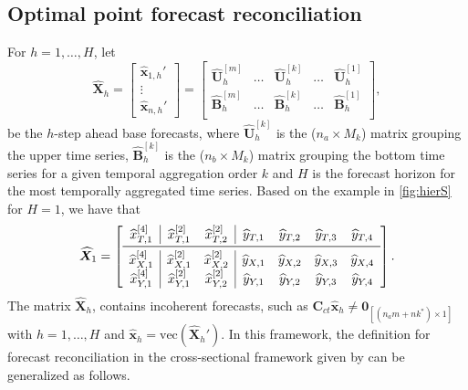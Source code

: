 \documentclass[a4paper,11pt]{article}
\newcommand{\xvet}{\bm{x}}
\newcommand{\Bvet}{\bm{B}}
\newcommand{\Cvet}{\bm{C}}
\newcommand{\Uvet}{\bm{U}}
\newcommand{\Xvet}{\bm{X}}
\newcommand{\Zerovet}{\bm{0}}
\theoremstyle{definition}
\begin{document}
\subsection{Optimal point forecast reconciliation}\label{ssec:oct}
For $h = 1, \dots, H$, let
$$
	\widehat{\Xvet}_{h} = \begin{bmatrix}
		\widehat{\xvet}_{1,h}' \\[-0.1cm]
		\vdots                \\[-0.2cm]
		\widehat{\xvet}_{n,h}'
	\end{bmatrix} =\begin{bmatrix}
		\widehat{\Uvet}_{h}^{[m]} & \dots & \widehat{\Uvet}_{h}^{[k]} & \dots & \widehat{\Uvet}_{h}^{[1]} \\[0.25cm]
		\widehat{\Bvet}_{h}^{[m]} & \dots & \widehat{\Bvet}_{h}^{[k]} & \dots & \widehat{\Bvet}_{h}^{[1]} \\\end{bmatrix},
$$
be the $h$-step ahead base forecasts, where $\widehat{\Uvet}_{h}^{[k]}$ is the ($n_a\times M_k$) matrix grouping the upper time series, $\widehat{\Bvet}_{h}^{[k]}$ is the ($n_b\times M_k$) matrix grouping the bottom time series for a given temporal aggregation order $k$ and $H$ is the forecast horizon for the most temporally aggregated time series. Based on the example in \autoref{fig:hierS} for $H = 1$, we have that
$$
\widehat{\Xvet}_1 = \left[\begin{array}{c|cc|cccc}
\widehat{x}^{[4]}_{T,1} & \widehat{x}^{[2]}_{T,1} & \widehat{x}^{[2]}_{T,2} & \widehat{y}_{T,1} & \widehat{y}_{T,2} & \widehat{y}_{T,3} & \widehat{y}_{T,4}\\
\midrule
\widehat{x}^{[4]}_{X,1} & \widehat{x}^{[2]}_{X,1} & \widehat{x}^{[2]}_{X,2} & \widehat{y}_{X,1} & \widehat{y}_{X,2} & \widehat{y}_{X,3} & \widehat{y}_{X,4}\\
\widehat{x}^{[4]}_{Y,1} & \widehat{x}^{[2]}_{Y,1} & \widehat{x}^{[2]}_{Y,2} & \widehat{y}_{Y,1} & \widehat{y}_{Y,2} & \widehat{y}_{Y,3} & \widehat{y}_{Y,4}\\
\end{array}\right].
$$
The matrix $\widehat{\Xvet}_{h}$, %
contains incoherent forecasts, such as $\Cvet_{ct} \widehat{\xvet}_{h} \neq \Zerovet_{[(n_am+nk^\ast)\times1]}$
with $h = 1, \dots, H$ and $\widehat{\xvet}_{h} = \mathrm{vec}(\widehat{\Xvet}_{h}')$. In this framework, the definition for forecast reconciliation in the cross-sectional framework given by \cite{panagiotelis2021} can be generalized as follows.
\end{document}

